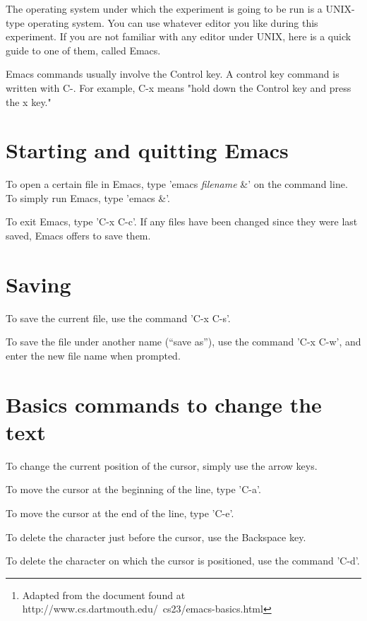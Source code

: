\documentclass{article}
\title{}
\author{Emacs basics\footnote{Adapted from the document found at http://www.cs.dartmouth.edu/~cs23/emacs-basics.html}}
\date{July 30, 2003}
\begin{document}
\maketitle
\begin{flushleft}

\thispagestyle{empty}

The operating system under which the experiment is going to be run is a 
UNIX-type operating system.  You can use whatever editor you like during
this experiment.  If you are not familiar with any editor under UNIX, here 
is a quick guide to one of them, called Emacs.

\vspace{0.2in}

Emacs commands usually involve the Control key.  A control key command is 
written with C-. For example, C-x means "hold down the Control key and press 
the x key."

\section*{Starting and quitting Emacs}
To open a certain file in Emacs, type 'emacs {\it filename} \&' on the command
line.  To simply run Emacs, type 'emacs \&'.

To exit Emacs, type 'C-x C-c'.   If any files have been changed since they were
last saved, Emacs offers to save them. 


\section*{Saving}
To save the current file, use the command 'C-x C-s'.

To save the file under another name (``save as''), use the command  'C-x C-w', 
and enter the new file name when prompted.


\section*{Basics commands to change the text}
To change the current position of the cursor, simply use the arrow keys.

To move the cursor at the beginning of the line, type 'C-a'.

To move the cursor at the end of the line, type 'C-e'.

To delete the character just before the cursor, use the Backspace key.

To delete the character on which the cursor is positioned, use the command 
'C-d'.


\end{flushleft}
\end{document}

